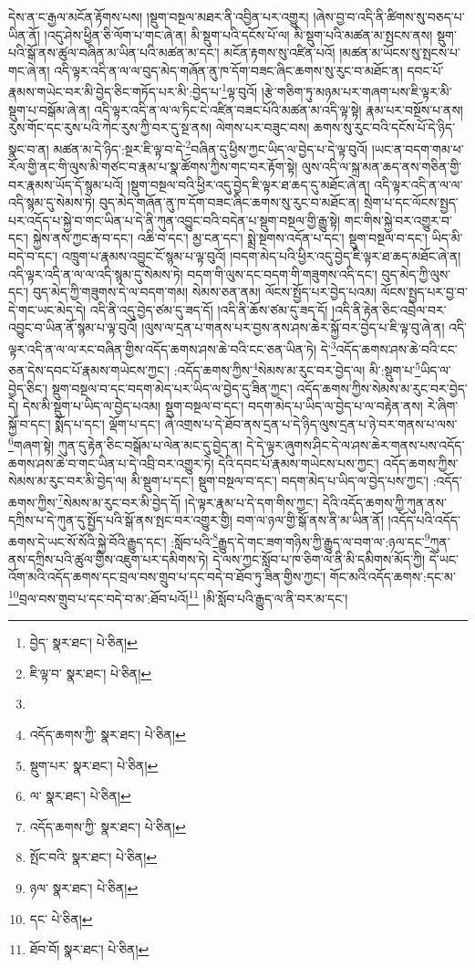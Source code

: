 དེས་ན་ང་རྒྱལ་མངོན་རྟོགས་པས། །སྡུག་བསྔལ་མཐར་ནི་འབྱིན་པར་འགྱུར། །ཞེས་བྱ་བ་འདི་ནི་ཚིགས་སུ་བཅད་པ་ཡིན་ནོ། །འདུ་ཤེས་ཕྱིན་ཅི་ལོག་པ་གང་ཞེ་ན། མི་སྡུག་པའི་དངོས་པོ་ལ། མི་སྡུག་པའི་མཚན་མ་སྤངས་ནས། སྡུག་པའི་སྒོ་ནས་ཚུལ་བཞིན་མ་ཡིན་པའི་མཚན་མ་དང་། མངོན་རྟགས་སུ་འཛིན་པའོ། །མཚན་མ་ཡོངས་སུ་སྤངས་པ་གང་ཞེ་ན། འདི་ལྟར་འདི་ན་ལ་ལ་བུད་མེད་གཞོན་ནུ་ཁ་དོག་བཟང་ཞིང་ཆགས་སུ་རུང་བ་མཐོང་ན། དབང་པོ་རྣམས་གཡེང་བར་མི་བྱེད་ཅིང་གཏོད་པར་མི་:བྱེད་པ་\footnote{བྱེད་  སྣར་ཐང་།  པེ་ཅིན། }ལྟ་བུའོ། །རྩེ་གཅིག་ཏུ་མཉམ་པར་གཞག་པས་ཇི་ལྟར་མི་སྡུག་པ་བསྒོམ་ཞེ་ན། འདི་ལྟར་འདི་ན་ལ་ལ་ཏིང་ངེ་འཛིན་བཟང་པོའི་མཚན་མ་འདི་ལྟ་སྟེ། རྣམ་པར་བསྔོས་པ་ནས། རུས་གོང་དང་རུས་པའི་ཀེང་རུས་ཀྱི་བར་དུ་སྔ་ནས། ལེགས་པར་བཟུང་བས། ཆགས་སུ་རུང་བའི་དངོས་པོ་དེ་ཉིད་སྣང་བ་ན། མཚན་མ་དེ་ཉིད་:སྔར་ཇི་ལྟ་བ་དེ་\footnote{ཇི་ལྟ་བ་  སྣར་ཐང་།  པེ་ཅིན། }བཞིན་དུ་ཕྱིས་ཀྱང་ཡིད་ལ་བྱེད་པ་དེ་ལྟ་བུའོ། །ཡང་ན་བདག་གམ་ཕ་རོལ་གྱི་ནང་གི་ལུས་མི་གཙང་བ་རྣམ་པ་སྣ་ཚོགས་ཀྱིས་གང་བར་རྟོག་སྟེ། ལུས་འདི་ལ་སྐྲ་མན་ཆད་ནས་གཅིན་གྱི་བར་རྣམས་ཡོད་དོ་སྙམ་པའོ། །སྡུག་བསྔལ་བའི་ཕྱིར་འདུ་བྱེད་ཇི་ལྟར་ཐ་ཆད་དུ་མཐོང་ཞེ་ན། འདི་ལྟར་འདི་ན་ལ་ལ་འདི་སྙམ་དུ་སེམས་ཏེ། བུད་མེད་གཞོན་ནུ་ཁ་དོག་བཟང་ཞིང་ཆགས་སུ་རུང་བ་མཐོང་ན། སྲེག་པ་དང་ལོངས་སྤྱད་པར་འདོད་པ་སྐྱེ་བ་གང་ཡིན་པ་དེ་ནི་ཀུན་འབྱུང་བའི་བདེན་པ་སྡུག་བསྔལ་གྱི་རྒྱུ་སྟེ། གང་གིས་སྐྱེ་བར་འགྱུར་བ་དང་། སྐྱེས་ནས་ཀྱང་རྒ་བ་དང་། འཆི་བ་དང་། མྱ་ངན་དང་། སྨྲེ་སྔགས་འདོན་པ་དང་། སྡུག་བསྔལ་བ་དང་། ཡིད་མི་བདེ་བ་དང་། འཁྲུག་པ་རྣམས་འབྱུང་ངོ་སྙམ་པ་ལྟ་བུའོ། །བདག་མེད་པའི་ཕྱིར་འདུ་བྱེད་ཇི་ལྟར་ཐ་ཆད་མཐོང་ཞེ་ན། འདི་ལྟར་འདི་ན་ལ་ལ་འདི་སྙམ་དུ་སེམས་ཏེ། བདག་གི་ལུས་དང་བདག་གི་གཟུགས་འདི་དང་། བུད་མེད་ཀྱི་ལུས་དང་། བུད་མེད་ཀྱི་གཟུགས་དེ་ལ་བདག་གམ། སེམས་ཅན་ནམ། ལོངས་སྤྱོད་པར་བྱེད་པའམ། ལོངས་སྤྱད་པར་བྱ་བ་དེ་གང་ཡང་མེད་དེ། འདི་ནི་འདུ་བྱེད་ཙམ་དུ་ཟད་དོ། །འདི་ནི་ཆོས་ཙམ་དུ་ཟད་དོ། །འདི་ནི་རྟེན་ཅིང་འབྲེལ་བར་འབྱུང་བ་ཡིན་ནོ་སྙམ་པ་ལྟ་བུའོ། །ལུས་ལ་དྲན་པ་གནས་པར་བྱས་ནས་ཤས་ཆེར་སྐྱོ་བར་བྱེད་པ་ཇི་ལྟ་བུ་ཞེ་ན། འདི་ལྟར་འདི་ན་ལ་ལ་རང་བཞིན་གྱིས་འདོད་ཆགས་ཤས་ཆེ་བའི་ངང་ཅན་ཡིན་ཏེ། དེ་\footnote{}འདོད་ཆགས་ཤས་ཆེ་བའི་ངང་ཅན་དེས་དབང་པོ་རྣམས་གཡེངས་ཀྱང་། :འདོད་ཆགས་ཀྱིས་\footnote{འདོད་ཆགས་ཀྱི་  སྣར་ཐང་།  པེ་ཅིན། }སེམས་མ་རུང་བར་བྱེད་ལ། མི་:སྡུག་པ་\footnote{སྡུག་པར་  སྣར་ཐང་།  པེ་ཅིན། }ཡིད་ལ་བྱེད་ཅིང་། སྡུག་བསྔལ་བ་དང་བདག་མེད་པར་ཡིད་ལ་བྱེད་དུ་ཟིན་ཀྱང་། འདོད་ཆགས་ཀྱིས་སེམས་མ་རུང་བར་བྱེད་དེ། དེས་མི་སྡུག་པ་ཡིད་ལ་བྱེད་པའམ། སྡུག་བསྔལ་བ་དང་། བདག་མེད་པ་ཡིད་ལ་བྱེད་པ་ལ་བརྟེན་ནས། རེ་ཞིག་སྐྱོ་བ་དང་། སྨོད་པ་དང་། ལྡོག་པ་དང་། ཞེ་འགྲས་པ་དེ་ཐོབ་ནས་དྲན་པ་དེ་ཉིད་ལུས་དྲན་པ་ཉེ་བར་གནས་པ་ལས་\footnote{ལ་  སྣར་ཐང་།  པེ་ཅིན། }གཞག་སྟེ། ཀུན་དུ་རྟེན་ཅིང་བསྒོམ་པ་ལེན་མང་དུ་བྱེད་ན། དེ་དེ་ལྟར་ཞུགས་ཤིང་དེ་ལ་ཤས་ཆེར་གནས་པས་འདོད་ཆགས་ཤས་ཆེ་བ་གང་ཡིན་པ་དེ་འབྲི་བར་འགྱུར་ཏེ། དེའི་དབང་པོ་རྣམས་གཡེངས་པས་ཀྱང་། འདོད་ཆགས་ཀྱིས་སེམས་མ་རུང་བར་མི་བྱེད་ལ། མི་སྡུག་པ་དང་། སྡུག་བསྔལ་བ་དང་། བདག་མེད་པ་ཡིད་ལ་བྱེད་པས་ཀྱང་། :འདོད་ཆགས་ཀྱིས་\footnote{འདོད་ཆགས་ཀྱི་  སྣར་ཐང་།  པེ་ཅིན། }སེམས་མ་རུང་བར་མི་བྱེད་དོ། །དེ་ལྟར་རྣམ་པ་དེ་དག་གིས་ཀྱང་། དེའི་འདོད་ཆགས་ཀྱི་ཀུན་ནས་དཀྲིས་པ་དེ་ཀུན་དུ་སྤྱོད་པའི་སྒོ་ནས་སྤང་བར་འགྱུར་གྱི། བག་ལ་ཉལ་གྱི་སྒོ་ནས་ནི་མ་ཡིན་ནོ། །འདོད་པའི་འདོད་ཆགས་དེ་ཡང་སོ་སོའི་སྐྱེ་བོའི་རྒྱུད་དང་། :སློབ་པའི་\footnote{སྤོང་བའི་  སྣར་ཐང་།  པེ་ཅིན། }རྒྱུད་དེ་གང་ཟག་གཉིས་ཀྱི་རྒྱུད་ལ་བག་ལ་:ཉལ་དང་\footnote{ཉལ་  སྣར་ཐང་།  པེ་ཅིན། }ཀུན་ནས་དཀྲིས་པའི་ཚུལ་གྱིས་འཇུག་པར་དམིགས་ཏེ། དེ་ལས་ཀྱང་སློབ་པ་ཁ་ཅིག་ལ་ནི་མི་དམིགས་མོད་ཀྱི། དེ་ཡང་འོག་མའི་འདོད་ཆགས་དང་བྲལ་བས་གྲུབ་པ་དང་བདེ་བ་ཐོབ་ཏུ་ཟིན་གྱིས་ཀྱང་། གོང་མའི་འདོད་ཆགས་:དང་མ་\footnote{དང་  པེ་ཅིན། }བྲལ་བས་གྲུབ་པ་དང་བདེ་བ་མ་:ཐོབ་པའོ།\footnote{ཐོབ་བོ།  སྣར་ཐང་།  པེ་ཅིན། } །མི་སློབ་པའི་རྒྱུད་ལ་ནི་བར་མ་དང་། 